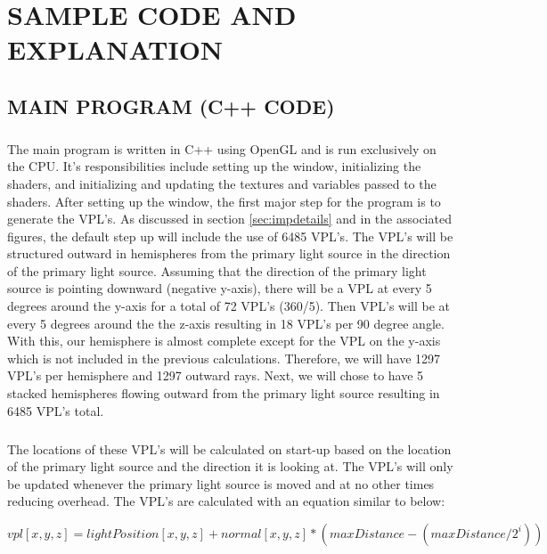 \chapter{SAMPLE CODE AND EXPLANATION}

\section{MAIN PROGRAM (C++ CODE)}
\paragraph{}
The main program is written in C++ using OpenGL and is run exclusively on the CPU.  It's responsibilities include setting up the window, initializing the shaders, and initializing and updating the textures and variables passed to the shaders.  After setting up the window, the first major step for the program is to generate the VPL's.  As discussed in section \ref{sec:impdetails} and in the associated figures, the default step up will include the use of 6485 VPL's.  The VPL's will be structured outward in hemispheres from the primary light source in the direction of the primary light source.  Assuming that the direction of the primary light source is pointing downward (negative y-axis), there will be a VPL at every 5 degrees around the y-axis for a total of 72 VPL's (360/5).  Then VPL's will be at every 5 degrees around the the z-axis resulting in 18 VPL's per 90 degree angle.  With this, our hemisphere is almost complete except for the VPL on the y-axis which is not included in the previous calculations. Therefore, we will have 1297 VPL's per hemisphere and 1297 outward rays.  Next, we will chose to have 5 stacked hemispheres flowing outward from the primary light source resulting in 6485 VPL's total.  

\paragraph{}
The locations of these VPL's will be calculated on start-up based on the location of the primary light source and the direction it is looking at.  The VPL's will only be updated whenever the primary light source is moved and at no other times reducing overhead.  The VPL's are calculated with an equation similar to below:

\begin{dmath}
vpl[x,y,z] = lightPosition[x,y,z] + normal[x,y,z]
	*(maxDistance - (maxDistance/2^i)) \label{eqn:vplPosition}
\end{dmath}

